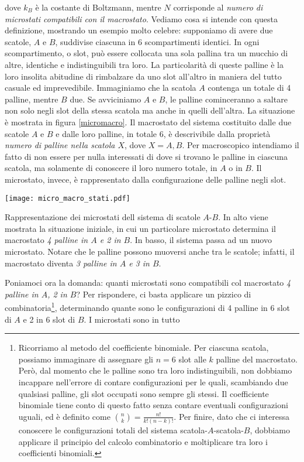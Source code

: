 \noindent dove $k_B$ è la costante di Boltzmann, mentre $N$
corrisponde al \textit{numero di microstati compatibili con il
macrostato}. Vediamo cosa si intende con questa definizione,
mostrando un esempio molto celebre: supponiamo di avere due
scatole, $A$ e $B$, suddivise ciascuna in 6 scompartimenti
identici. In ogni scompartimento, o slot, può essere collocata
una sola pallina tra un mucchio di altre, identiche e indistinguibili
tra loro. La particolarità
di queste palline è la loro insolita abitudine di rimbalzare
da uno slot all'altro in maniera del tutto casuale ed imprevedibile.
Immaginiamo che la scatola $A$ contenga
un totale di 4 palline, mentre $B$ due. Se avviciniamo $A$ e
$B$, le palline cominceranno a saltare non solo negli slot
della stessa scatola ma anche in quelli dell'altra. La situazione è
mostrata in figura \ref{micromacro}. Il macrostato del sistema
costituito dalle due scatole $A$ e $B$ e dalle loro palline,
in totale 6, è descrivibile dalla proprietà \textit{numero di palline nella scatola $X$},
dove $X = A, B$. Per macroscopico intendiamo
il fatto di non essere per nulla interessati di dove si trovano
le palline in ciascuna scatola, ma solamente di conoscere il
loro numero totale, in $A$ o in $B$. Il microstato, invece,
è rappresentato dalla configurazione delle palline negli slot.

\begin{marginfigure}
    \centering
    \texttt{[image: micro\_macro\_stati.pdf]}
    \caption{Rappresentazione dei microstati dell sistema di scatole
    $A$-$B$. In alto viene mostrata la situazione iniziale, in cui
    un particolare microstato determina il macrostato \textit{4 palline
    in $A$ e 2 in $B$}. In basso, il sistema passa ad un nuovo microstato.
    Notare che le palline possono muoversi anche tra le scatole; infatti,
    il macrostato diventa \textit{3 palline in $A$ e 3 in $B$}.}
    \label{micromacro}
\end{marginfigure}

Poniamoci ora la domanda: quanti microstati sono compatibili
col macrostato \textit{4 palline in $A$, 2 in $B$}? Per rispondere,
ci basta applicare un pizzico di combinatoria\footnote{Ricorriamo
al metodo del coefficiente binomiale. Per ciascuna scatola, possiamo immaginare
di assegnare gli $n = 6$ slot alle $k$ palline del macrostato. Però, dal
momento che le palline sono tra loro indistinguibili, non dobbiamo incappare
nell'errore di contare configurazioni per le quali, scambiando due qualsiasi
palline, gli slot occupati sono sempre gli stessi. Il coefficiente binomiale
tiene conto di questo fatto senza contare eventuali configurazioni uguali,
ed è definito come $\binom{n}{k} = \frac{n!}{k!(n - k)!}$. Per finire, dato
che ci interessa conoscere le configurazioni totali del sistema scatola-$A$-scatola-$B$,
dobbiamo applicare il principio del calcolo combinatorio e moltiplicare tra
loro i coefficienti binomiali.},
determinando quante sono le configurazioni di 4 palline in 6 slot di $A$
e 2 in 6 slot di $B$. I microstati sono in tutto

